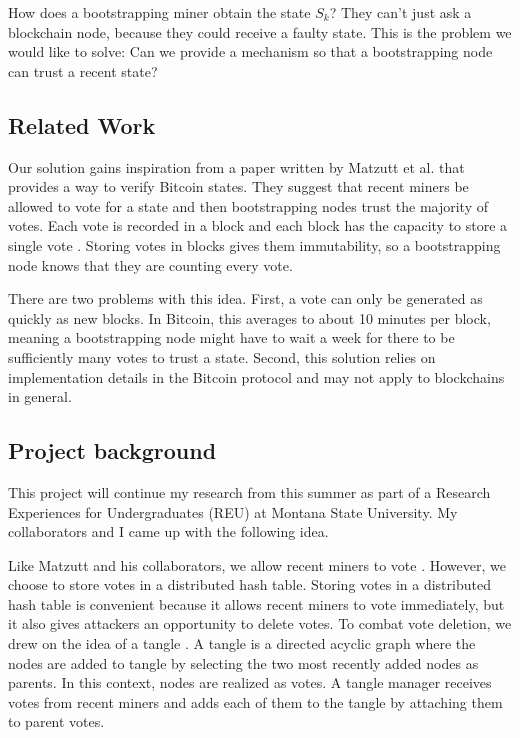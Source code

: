 How does a bootstrapping miner obtain the state $S_k$?
They can't just ask a blockchain node, because they could receive a faulty state.
This is the problem we would like to solve: Can we provide a mechanism so that a bootstrapping node can trust a recent state?

\subsection{Related Work}

Our solution gains inspiration from a paper written by Matzutt et al. that provides a way to verify Bitcoin states.
They suggest that recent miners be allowed to vote for a state and then bootstrapping nodes trust the majority of votes.
Each vote is recorded in a block and each block has the capacity to store a single vote \cite{Matzutt2020HowTS}.
Storing votes in blocks gives them immutability, so a bootstrapping node knows that they are counting every vote.

There are two problems with this idea.
First, a vote can only be generated as quickly as new blocks.
In Bitcoin, this averages to about 10 minutes per block, meaning a bootstrapping node might have to wait a week for there to be sufficiently many votes to trust a state.
Second, this solution relies on implementation details in the Bitcoin protocol and may not apply to blockchains in general.

\subsection{Project background}

This project will continue my research from this summer as part of a Research Experiences for Undergraduates (REU) at Montana State University.
My collaborators and I came up with the following idea.

Like Matzutt and his collaborators, we allow recent miners to vote \cite{Matzutt2020HowTS}.
However, we choose to store votes in a distributed hash table.
Storing votes in a distributed hash table is convenient because it allows recent miners to vote immediately, but it also gives attackers an opportunity to delete votes.
To combat vote deletion, we drew on the idea of a tangle \cite{popov2016tangle}.
A tangle is a directed acyclic graph where the nodes are added to tangle by selecting the two most recently added nodes as parents.
In this context, nodes are realized as votes.
A tangle manager receives votes from recent miners and adds each of them to the tangle by attaching them to parent votes.

